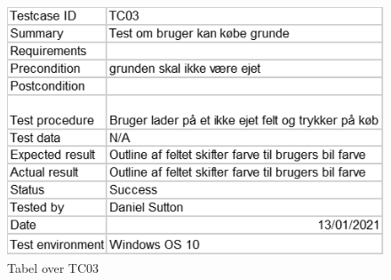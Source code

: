 \begin{flushleft}
\begin{figure}[htp] %
    \centering
    \includegraphics[width=14cm]{Report/figures/Usertests/TC03.png}
    \caption{Tabel over TC03}
    \label{Testcase03}
\end{figure}

\end{flushleft}